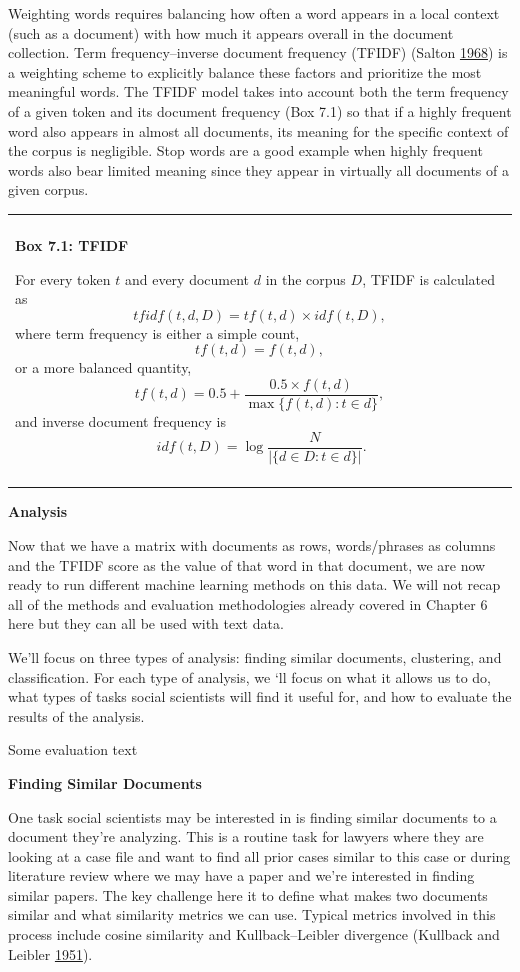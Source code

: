 \documentclass[]{krantz}
\newenvironment{F00}
    {\begin{center}
    \begin{tabular}{|p{0.9\textwidth}|}
    \hline\\
    }
    { 
    \\\\\hline
    \end{tabular} 
    \end{center}
    }
\begin{document}
Weighting words requires balancing how often a word appears in a local
context (such as a document) with how much it appears overall in the
document collection. Term frequency--inverse document frequency (TFIDF)
(Salton \protect\hyperlink{ref-salton-68}{1968}) is a weighting scheme
to explicitly balance these factors and prioritize the most meaningful
words. The TFIDF model takes into account both the term frequency of a
given token and its document frequency (Box 7.1) so that if a highly
frequent word also appears in almost all documents, its meaning for the
specific context of the corpus is negligible. Stop words are a good
example when highly frequent words also bear limited meaning since they
appear in virtually all documents of a given corpus.

\begin{F00}
\textbf{Box 7.1: TFIDF}

For every token \(t\) and every document \(d\) in the corpus \(D\),
TFIDF is calculated as \[tfidf(t,d,D) = tf(t,d) \times
idf(t,D),\] where term frequency is either a simple count,
\[tf(t,d)=f(t,d),\] or a more balanced quantity,
\[tf(t,d) = 0.5+\frac{0.5 \times
  f(t,d)}{\max\{f(t,d):t\in d\}},\] and inverse document frequency is
\[\
idf(t,D) = \log\frac{N}{|\{d\in D:t\in d\}|}.\]
\end{F00}

\enlargethispage{24pt} \vspace*{-36pt}

\textbf{Analysis}

Now that we have a matrix with documents as rows, words/phrases as
columns and the TFIDF score as the value of that word in that document,
we are now ready to run different machine learning methods on this data.
We will not recap all of the methods and evaluation methodologies
already covered in Chapter 6 here but they can all be used with text
data.

We'll focus on three types of analysis: finding similar documents,
clustering, and classification. For each type of analysis, we `ll focus
on what it allows us to do, what types of tasks social scientists will
find it useful for, and how to evaluate the results of the analysis.

Some evaluation text

\textbf{Finding Similar Documents}

One task social scientists may be interested in is finding similar
documents to a document they're analyzing. This is a routine task for
lawyers where they are looking at a case file and want to find all prior
cases similar to this case or during literature review where we may have
a paper and we're interested in finding similar papers. The key
challenge here it to define what makes two documents similar and what
similarity metrics we can use. Typical metrics involved in this process
include cosine similarity and Kullback--Leibler divergence (Kullback and
Leibler \protect\hyperlink{ref-kullback1951information}{1951}).
\end{document}
